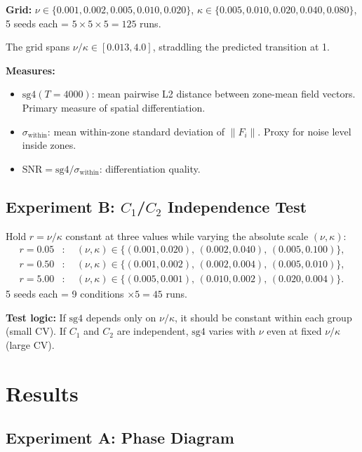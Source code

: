 \documentclass[11pt]{article}
\begin{document}
\textbf{Grid:}
$\nu \in \{0.001, 0.002, 0.005, 0.010, 0.020\}$,
$\kappa \in \{0.005, 0.010, 0.020, 0.040, 0.080\}$,
5 seeds each = $5 \times 5 \times 5 = 125$ runs.

The grid spans $\nu/\kappa \in [0.013, 4.0]$, straddling the predicted transition at 1.

\textbf{Measures:}
\begin{itemize}
\item $\mathrm{sg4}(T=4000)$: mean pairwise L2 distance between zone-mean field vectors.
  Primary measure of spatial differentiation.
\item $\sigma_{\mathrm{within}}$: mean within-zone standard deviation of $\|F_i\|$.
  Proxy for noise level inside zones.
\item $\mathrm{SNR} = \mathrm{sg4} / \sigma_{\mathrm{within}}$: differentiation quality.
\end{itemize}

\subsection*{Experiment B: $C_1$/$C_2$ Independence Test}

Hold $r = \nu/\kappa$ constant at three values while varying the absolute scale $(\nu, \kappa)$:
\begin{align*}
r = 0.05&: \quad (\nu, \kappa) \in \{(0.001, 0.020),\,(0.002, 0.040),\,(0.005, 0.100)\},\\
r = 0.50&: \quad (\nu, \kappa) \in \{(0.001, 0.002),\,(0.002, 0.004),\,(0.005, 0.010)\},\\
r = 5.00&: \quad (\nu, \kappa) \in \{(0.005, 0.001),\,(0.010, 0.002),\,(0.020, 0.004)\}.
\end{align*}
5 seeds each = 9 conditions $\times 5 = 45$ runs.

\textbf{Test logic:} If $\mathrm{sg4}$ depends only on $\nu/\kappa$, it should be constant
within each group (small CV). If $C_1$ and $C_2$ are independent, $\mathrm{sg4}$ varies
with $\nu$ even at fixed $\nu/\kappa$ (large CV).

\section{Results}

\subsection{Experiment A: Phase Diagram}
\end{document}
